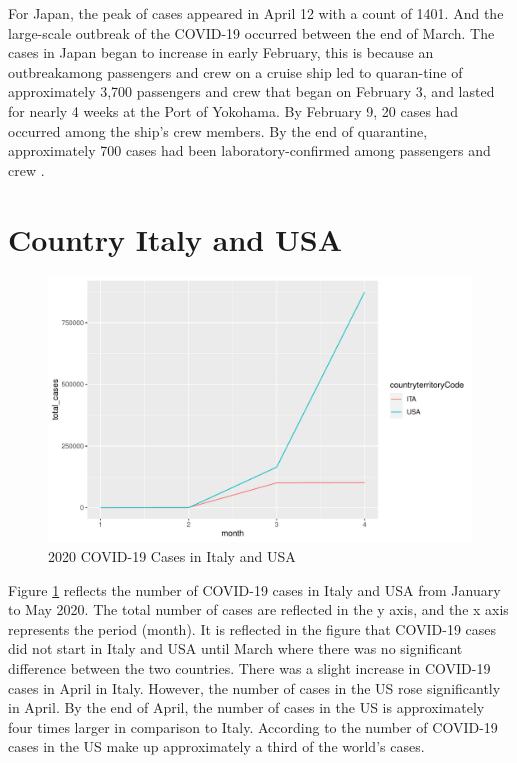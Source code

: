\documentclass[11pt,a4paper,]{article}
\begin{document}
For Japan, the peak of cases appeared in April 12 with a count of 1401. And the large-scale outbreak of the COVID-19 occurred between the end of March. The cases in Japan began to increase in early February, this is because an outbreakamong passengers and crew on a cruise ship led to quaran-tine of approximately 3,700 passengers and crew that began on February 3, and lasted for nearly 4 weeks at the Port of Yokohama. By February 9, 20 cases had occurred among the ship's crew members. By the end of quarantine, approximately 700 cases had been laboratory-confirmed among passengers and crew \autocite{kakimoto2020initial}.

\clearpage

\section*{Country Italy and USA}

\begin{figure}
\centering
\includegraphics{report_files/figure-latex/cases-plot-1.pdf}
\caption{\label{fig:cases-plot}2020 COVID-19 Cases in Italy and USA}
\end{figure}

Figure \ref{fig:cases-plot} reflects the number of COVID-19 cases in Italy and USA from January to May 2020. The total number of cases are reflected in the y axis, and the x axis represents the period (month). It is reflected in the figure that COVID-19 cases did not start in Italy and USA until March where there was no significant difference between the two countries. There was a slight increase in COVID-19 cases in April in Italy. However, the number of cases in the US rose significantly in April. By the end of April, the number of cases in the US is approximately four times larger in comparison to Italy. According to \autocite{vox} the number of COVID-19 cases in the US make up approximately a third of the world's cases.
\end{document}
